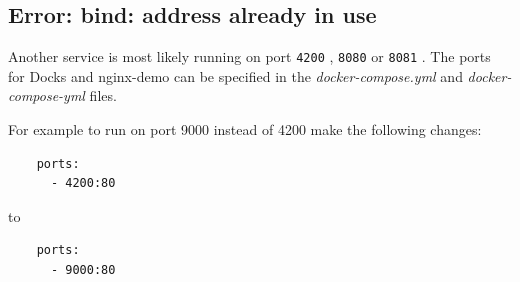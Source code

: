 \documentclass[]{article}
\let\oldtexttt\texttt
\renewcommand{\texttt}[1]{
	\colorbox{Light}{\oldtexttt{#1}}
}
\begin{document}
\subsection{Error: bind: address already in use}
Another service is most likely running on port \texttt{4200}, \texttt{8080} or \texttt{8081}.
The ports for Docks and nginx-demo can be specified in the \emph{docker-compose.yml} 
and \emph{docker-compose-yml} files.

For example to run on port 9000 instead of 4200 make the following changes:

\begin{lstlisting}
    ports:
      - 4200:80
\end{lstlisting}
to
\begin{lstlisting}
    ports:
      - 9000:80
\end{lstlisting}
\end{document}
